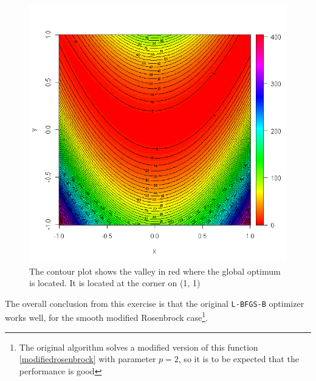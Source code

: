 \begin{figure}
\begin{center}
\includegraphics[scale=0.5]{Figures/contour.PNG}
\caption[Contour Plot of the Original Rosenbrock Function]{The contour plot shows the valley in red where the global optimum is located. It is located at the corner on (1, 1)}
\label{contourbanana}
\end{center}
\end{figure}

The overall conclusion from this exercise is that the original \texttt{L-BFGS-B} optimizer works well, for the smooth modified Rosenbrock case\footnote{The original algorithm solves a modified version of this function \eqref{modifiedrosenbrock} with parameter $p = 2$, so it is to be expected that the performance is good}.

